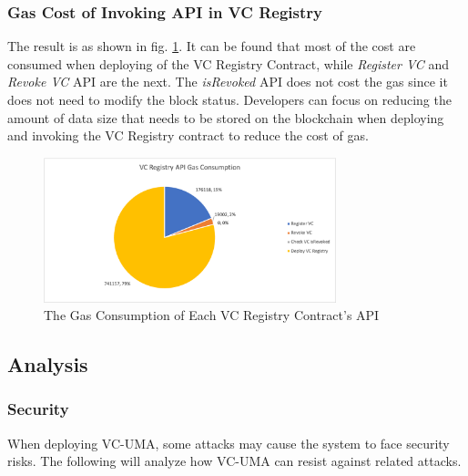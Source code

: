 \documentclass[conference, dvipdfmx]{IEEEtran} %
\begin{document}
\begin{sloppypar}
\subsubsection{Gas Cost of Invoking API in VC Registry}

The result is as shown in fig. \ref{fig:vc_gas_consumption}. It can be found that most of the cost are consumed when deploying of the VC Registry Contract, while \textit{Register VC} and \textit{Revoke VC} API are the next. The \textit{isRevoked} API does not cost the gas since it does not need to modify the block status. 
Developers can focus on reducing the amount of data size that needs to be stored on the blockchain when deploying and invoking the VC Registry contract to reduce the cost of gas.

\begin{figure}[htbp] %
  \begin{center} %
  \includegraphics[width=85mm]{images/exper_fig/vc_gas_consumption.png} %
  \caption{The Gas Consumption of Each VC Registry Contract's API} %
  \label{fig:vc_gas_consumption} %
  \end{center}
\end{figure}


\subsection{Analysis}

\subsubsection{Security}
When deploying VC-UMA, some attacks may cause the system to face security risks. The following will analyze how VC-UMA can resist against related attacks.


\end{sloppypar}
\end{document}
